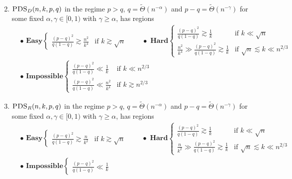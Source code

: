 \documentclass[11pt]{article}
\begin{document}
\begin{theorem}
\begin{enumerate}
\begin{align*}
\end{align*}
\item $\textsc{PDS}_D(n, k, p, q)$ in the regime $p > q$, $q = \tilde{\Theta}(n^{-\alpha})$ and $p - q = \tilde{\Theta}(n^{-\gamma})$ for some fixed $\alpha, \gamma \in [0, 1)$ with $\gamma \ge \alpha$, has regions
\begin{align*}
&\bullet \, \, \mathbf{Easy} \left\{ \begin{array}{ll} \frac{(p - q)^2}{q(1 -q)} \gtrsim \frac{n^2}{k^4} &\text{if } k \gtrsim \sqrt{n} \end{array} \right. \quad \quad  \bullet \, \, \mathbf{Hard} \left\{ \begin{array}{ll} \frac{(p - q)^2}{q(1 -q)} \gtrsim \frac{1}{k} &\text{if } k \ll \sqrt{n} \\ \frac{n^2}{k^4} \gg \frac{(p - q)^2}{q(1 -q)} \gtrsim \frac{1}{k} &\text{if } \sqrt{n} \lesssim k \ll n^{2/3} \end{array} \right. \\
& \bullet \, \, \mathbf{Impossible} \left\{ \begin{array}{ll} \frac{(p - q)^2}{q(1 -q)} \ll \frac{1}{k} &\text{if } k \ll n^{2/3} \\ \frac{(p - q)^2}{q(1 -q)} \ll \frac{n^2}{k^4} &\text{if } k \gtrsim n^{2/3} \end{array} \right.
\end{align*}
\item$\textsc{PDS}_R(n, k, p, q)$ in the regime $p > q$, $q = \tilde{\Theta}(n^{-\alpha})$ and $p - q = \tilde{\Theta}(n^{-\gamma})$ for some fixed $\alpha, \gamma \in [0, 1)$ with $\gamma \ge \alpha$, has regions
\begin{align*}
&\bullet \, \, \mathbf{Easy} \left\{ \begin{array}{ll} \frac{(p - q)^2}{q(1 -q)} \gtrsim \frac{n}{k^2} &\text{if } k \gtrsim \sqrt{n} \end{array} \right. \quad \quad  \bullet \, \, \mathbf{Hard} \left\{ \begin{array}{ll} \frac{(p - q)^2}{q(1 -q)} \gtrsim \frac{1}{k} &\text{if } k \ll \sqrt{n} \\ \frac{n}{k^2} \gg \frac{(p - q)^2}{q(1 -q)} \gtrsim \frac{1}{k} &\text{if } \sqrt{n} \lesssim k \ll n^{2/3} \end{array} \right. \\
& \bullet \, \, \mathbf{Impossible} \left\{ \begin{array}{ll} \frac{(p - q)^2}{q(1 -q)} \ll \frac{1}{k} \end{array} \right.

\end{align*}
\end{enumerate}
\end{theorem}
\end{document}
